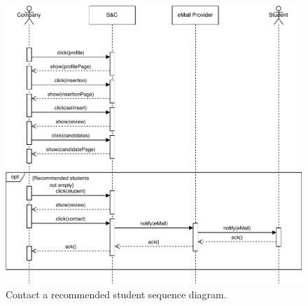\begin{figure}[H]
    \begin{center}
        \includegraphics[width=\linewidth]{Images/SequenceDiagram/ContactStudentSD.pdf}
        \caption{Contact a recommended student sequence diagram.}
        \label{fig:contact_student_seqdiag}%
    \end{center}
\end{figure}

\newpage

